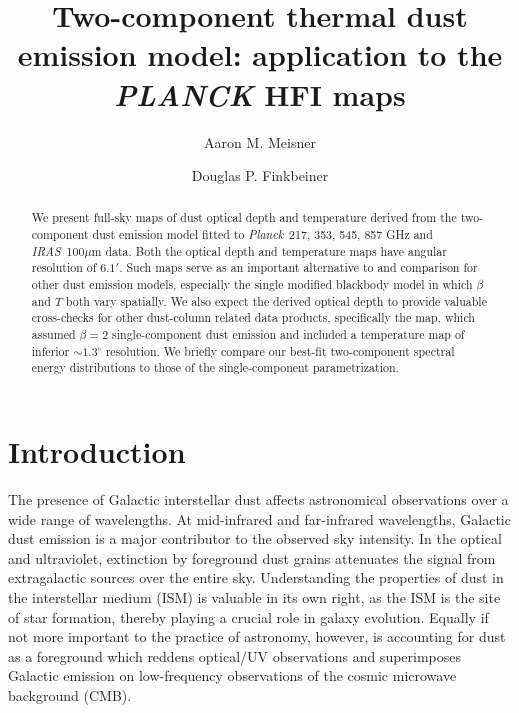 \documentclass{emulateapj}
\newcommand{\IRAS}{{\it IRAS}}
\newcommand{\PLANCK}{{\it Planck}}
\begin{document}
 

\title{Two-component thermal dust emission model: application to the {\it PLANCK} HFI maps}
\author{Aaron M. Meisner}
\author{Douglas P. Finkbeiner}

\begin{abstract}
We present full-sky maps of dust optical depth and temperature derived from 
the \cite{FDS99} two-component dust emission model fitted to \PLANCK~217, 353, 
545, 857 GHz and \cite{SFD} \IRAS~100$\mu$m data. Both the optical 
depth and temperature maps have angular resolution of $6.1'$. Such maps serve 
as an important alternative to and comparison for other dust 
emission models, especially the single modified blackbody model in which 
$\beta$ and $T$ both vary spatially. We also expect the derived optical 
depth to provide valuable cross-checks for other dust-column related data 
products, specifically the \cite{SFD} map, which assumed 
$\beta = 2$ single-component dust emission and included a temperature map of 
inferior $\sim$$1.3^{\circ}$ resolution. We briefly compare our 
best-fit two-component spectral energy distributions to those of the 
\cite{planckdust} single-component parametrization.
\end{abstract}

\section{Introduction}
The presence of Galactic interstellar dust affects
astronomical observations over a wide range of wavelengths. At mid-infrared
and far-infrared wavelengths, Galactic dust emission is a major contributor
to the observed sky intensity. In the optical and ultraviolet, extinction
by foreground dust grains attenuates the signal from extragalactic sources
over the entire sky. Understanding the properties of dust in the interstellar 
medium (ISM) is valuable in its own right, as the ISM is the site of star 
formation, thereby playing a crucial role in galaxy evolution. Equally if not 
more important to the practice of astronomy, however, is accounting for dust 
as a foreground which reddens optical/UV observations and superimposes 
Galactic emission on low-frequency observations of the 
cosmic microwave background (CMB). 
\end{document}
